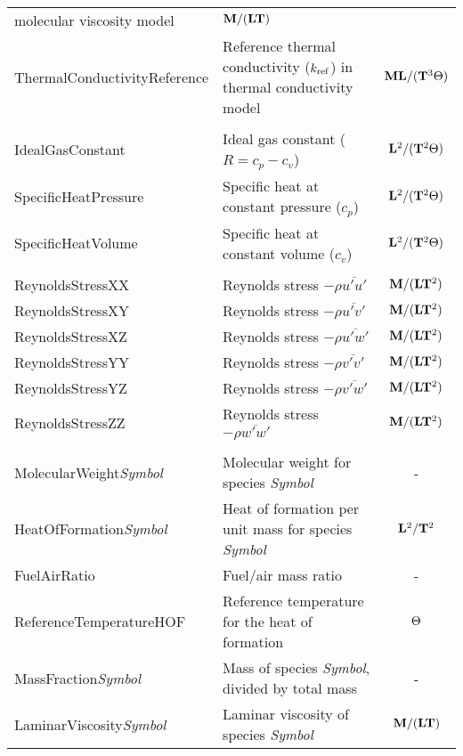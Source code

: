 \begin{longtable}{>{\ttfamily}l >{\raggedright\arraybackslash}p{\Pwidth} c}
                               molecular viscosity model &
   ${\bf M}/({\bf L} {\bf T})$ \\
ThermalConductivityReference & Reference thermal conductivity ($k_{\rm ref}$)
                               in thermal conductivity model &
   ${\bf M} {\bf L}/({\bf T}^3 {\Theta})$ \\
\\
IdealGasConstant        & Ideal gas constant ($R = c_p - c_v$) &
   ${\bf L}^2/({\bf T}^2 {\Theta})$ \\
SpecificHeatPressure    & Specific heat at constant pressure ($c_p$) &
   ${\bf L}^2/({\bf T}^2 {\Theta})$ \\
SpecificHeatVolume      & Specific heat at constant volume ($c_v$) &
   ${\bf L}^2/({\bf T}^2 {\Theta})$ \\
\\
ReynoldsStressXX        & Reynolds stress $-\rho \overline{u' u'}$ &
   ${\bf M}/({\bf L} {\bf T}^2)$ \\
ReynoldsStressXY        & Reynolds stress $-\rho \overline{u' v'}$ &
   ${\bf M}/({\bf L} {\bf T}^2)$ \\
ReynoldsStressXZ        & Reynolds stress $-\rho \overline{u' w'}$ &
   ${\bf M}/({\bf L} {\bf T}^2)$ \\
ReynoldsStressYY        & Reynolds stress $-\rho \overline{v' v'}$ &
   ${\bf M}/({\bf L} {\bf T}^2)$ \\
ReynoldsStressYZ        & Reynolds stress $-\rho \overline{v' w'}$ &
   ${\bf M}/({\bf L} {\bf T}^2)$ \\
ReynoldsStressZZ        & Reynolds stress $-\rho \overline{w' w'}$ &
   ${\bf M}/({\bf L} {\bf T}^2)$ \\
\\
MolecularWeight\textit{Symbol}     & Molecular weight for species
                                     \textit{Symbol} &
   - \\
HeatOfFormation\textit{Symbol}     & Heat of formation per unit mass for species
                                     \textit{Symbol} &
   ${\bf L}^2/{\bf T}^2$ \\
FuelAirRatio                       & Fuel/air mass ratio &
   - \\
ReferenceTemperatureHOF            & Reference temperature for the heat
                                     of formation &
   ${\Theta}$ \\
MassFraction\textit{Symbol}        & Mass of species \textit{Symbol},
                                     divided by total mass &
   - \\
LaminarViscosity\textit{Symbol}    & Laminar viscosity of species
                                     \textit{Symbol} &
   ${\bf M}/({\bf L} {\bf T})$ \\

\end{longtable}
